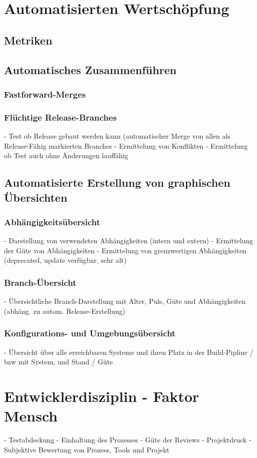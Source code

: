\section{Automatisierten Wertschöpfung}
\subsection{Metriken}
\label{subsec:auto-values-metrics}
\subsection{Automatisches Zusammenführen}
\subsubsection{Fastforward-Merges}
\subsubsection{Flüchtige Release-Branches}
- Test ob Release gebaut werden kann (automatischer Merge von allen als Release-Fähig markierten Branches
- Ermittelung von Konflikten
- Ermittelung ob Test auch ohne Änderungen lauffähig
\subsection{Automatisierte Erstellung von graphischen Übersichten}
\subsubsection{Abhängigkeitsübersicht}
- Darstellung von verwendeten Abhängigkeiten (intern und extern)
- Ermittelung der Güte von Abhängigkeiten
- Ermittelung von grenzwertigen Abhängigkeiten (deprecated, update verfügbar, sehr alt)
\subsubsection{Branch-Übersicht}
- Übersichtliche Branch-Darstellung mit Alter, Puls, Güte und Abhängigkeiten (abhäng. zu autom. Release-Erstellung)
\subsubsection{Konfigurations- und Umgebungsübersicht}
- Übersicht über alle erreichbaren Systeme und ihren Platz in der Build-Pipline / bzw mit System, und Stand / Güte
\section{Entwicklerdisziplin - Faktor Mensch}
- Testabdeckung
- Einhaltung des Prozesses
- Güte der Reviews
- Projektdruck
- Subjektive Bewertung von Prozess, Tools und Projekt

